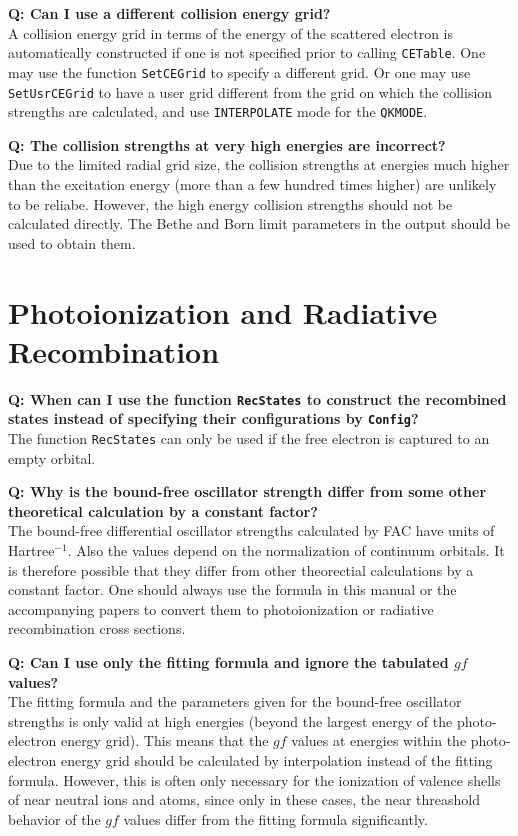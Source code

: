 \documentclass[twoside,letterpaper]{refrep}
\newcommand{\key}[1]{\texttt{#1}}
\newcounter{faq}[section]
\newcommand{\faq}[2]{\stepcounter{faq}
	\begin{minipage}{\textwidth}
	\textbf{Q\arabic{faq}: #1?}\\#2
	\end{minipage}}
\begin{document}
\faq{Can I use a different collision energy grid}{
A collision energy grid in terms of the energy of the scattered electron is
automatically constructed if one is not specified prior to calling
\key{CETable}. One may use the function \key{SetCEGrid} to specify a different
grid. Or one may use \key{SetUsrCEGrid} to have a user grid different from the
grid on which the collision strengths are calculated, and use
\key{INTERPOLATE} mode for the \key{QKMODE}.}

\faq{The collision strengths at very high energies are incorrect}{
Due to the limited radial grid size, the collision strengths at energies much
higher than the excitation energy (more than a few hundred times higher) are
unlikely to be reliabe. However, the high energy collision strengths should
not be calculated directly. The Bethe and Born limit parameters in the output
should be used to obtain them.}

\section{Photoionization and Radiative Recombination}
\faq{When can I use the function \key{RecStates} to construct the
recombined states instead of specifying their configurations by \key{Config}}{
The function \key{RecStates} can only be used if the free electron is captured
to an empty orbital.}

\faq{Why is the bound-free oscillator strength differ from some other
theoretical calculation by a constant factor}{
The bound-free differential oscillator strengths calculated by FAC have units
of Hartree$^{-1}$. Also the values depend on the normalization of continuum
orbitals. It is therefore possible that they differ from other theorectial
calculations by a constant factor. One should always use the formula in this
manual or the accompanying papers to convert them to photoionization or
radiative recombination cross sections.}

\faq{Can I use only the fitting formula and ignore the tabulated $gf$
values}{
The fitting formula and the parameters given for the bound-free oscillator
strengths is only valid at high energies (beyond the largest energy of the
photo-electron energy grid). This means that the $gf$ values at energies
within the photo-electron energy grid should be calculated by interpolation
instead of the fitting formula. However, this is often only necessary for the
ionization of valence shells of near neutral ions and atoms, since only in
these cases, the near threashold behavior of the $gf$ values differ from the
fitting formula significantly.}
\end{document}
